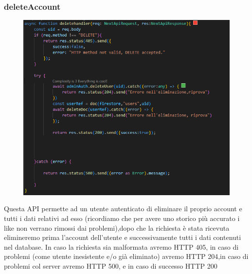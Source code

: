 \documentclass[11pt, a4paper]{article}
\theoremstyle{definition}
\begin{document}
\subsubsection{deleteAccount}
\begin{figure}[H]
  \centering
  \includegraphics[width=\textwidth]{materiale/API/deleteAccount.png}  
\end{figure}

Questa API permette ad un utente autenticato di eliminare il proprio account e tutti i dati relativi ad esso (ricordiamo che per avere uno storico più accurato i like non verrano rimossi dai problemi),dopo che la richiesta
è stata ricevuta elimineremo prima l'account dell'utente e successivamente tutti i dati contenuti nel database.
In caso la richiesta sia malformata avremo HTTP 405, in caso di problemi (come utente inesistente e/o già eliminato) avremo HTTP 204,in caso di problemi col server avremo HTTP 500, e in caso di successo HTTP 200
\end{document}
